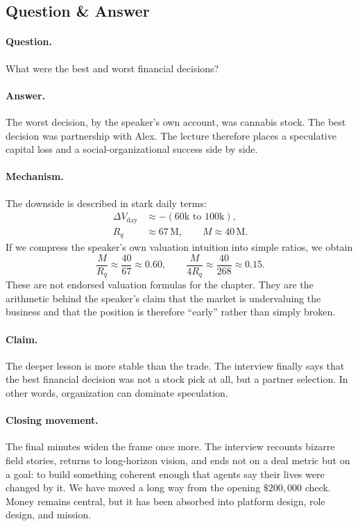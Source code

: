 \subsection{Question \& Answer}

\paragraph{Question.}
What were the best and worst financial decisions?

\paragraph{Answer.}
The worst decision, by the speaker's own account, was cannabis stock. The best decision was partnership with Alex. The lecture therefore places a speculative capital loss and a social-organizational success side by side.

\paragraph{Mechanism.}
The downside is described in stark daily terms:
\begin{align}
\Delta V_{\mathrm{day}} &\approx -(60\text{k to }100\text{k}), \\
R_q &\approx 67\,\mathrm{M},
\qquad
M \approx 40\,\mathrm{M}.
\end{align}
If we compress the speaker's own valuation intuition into simple ratios, we obtain
\begin{equation}
\frac{M}{R_q} \approx \frac{40}{67} \approx 0.60,
\qquad
\frac{M}{4R_q} \approx \frac{40}{268} \approx 0.15.
\end{equation}
These are not endorsed valuation formulas for the chapter. They are the arithmetic behind the speaker's claim that the market is undervaluing the business and that the position is therefore ``early'' rather than simply broken.

\paragraph{Claim.}
The deeper lesson is more stable than the trade. The interview finally says that the best financial decision was not a stock pick at all, but a partner selection. In other words, organization can dominate speculation.

\paragraph{Closing movement.}
The final minutes widen the frame once more. The interview recounts bizarre field stories, returns to long-horizon vision, and ends not on a deal metric but on a goal: to build something coherent enough that agents say their lives were changed by it. We have moved a long way from the opening \(\$200{,}000\) check. Money remains central, but it has been absorbed into platform design, role design, and mission.

